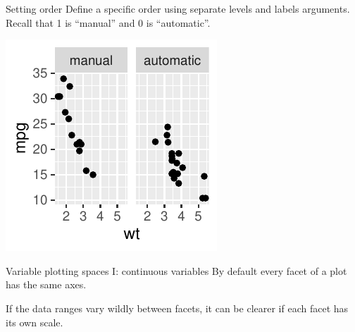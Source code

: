\documentclass[
  ignorenonframetext,
]{beamer}
\newenvironment{Shaded}{\begin{snugshade}}{\end{snugshade}}
\newcommand{\AttributeTok}[1]{\textcolor[rgb]{0.13,0.29,0.53}{#1}}
\newcommand{\CommentTok}[1]{\textcolor[rgb]{0.56,0.35,0.01}{\textit{#1}}}
\newcommand{\DecValTok}[1]{\textcolor[rgb]{0.00,0.00,0.81}{#1}}
\newcommand{\FunctionTok}[1]{\textcolor[rgb]{0.13,0.29,0.53}{\textbf{#1}}}
\newcommand{\NormalTok}[1]{#1}
\newcommand{\OtherTok}[1]{\textcolor[rgb]{0.56,0.35,0.01}{#1}}
\newcommand{\SpecialCharTok}[1]{\textcolor[rgb]{0.81,0.36,0.00}{\textbf{#1}}}
\newcommand{\StringTok}[1]{\textcolor[rgb]{0.31,0.60,0.02}{#1}}
\begin{document}
\begin{frame}[fragile]{Setting order}
\label{setting-order-3}
Define a specific order using separate levels and labels arguments.
Recall that 1 is ``manual'' and 0 is ``automatic''.


\begin{Shaded}
\end{Shaded}

\begin{center}\includegraphics[width=0.5\linewidth]{Figs/unnamed-chunk-87-1} \end{center}
\end{frame}

\begin{frame}{Variable plotting spaces I: continuous variables}
\label{variable-plotting-spaces-i-continuous-variables}
By default every facet of a plot has the same axes.

If the data ranges vary wildly between facets, it can be clearer if each
facet has its own scale.
\end{frame}
\end{document}
